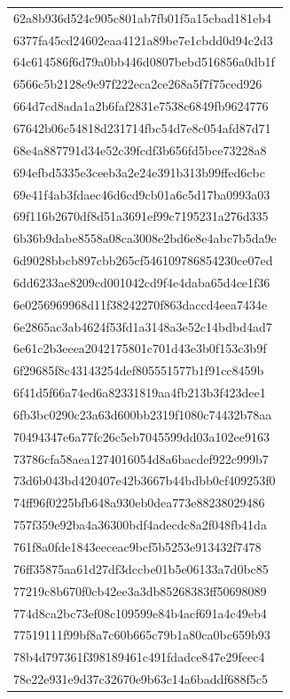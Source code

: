 \begin{tabular}{l}
62a8b936d524c905c801ab7fb01f5a15cbad181eb4 \\
6377fa45cd24602eaa4121a89be7e1cbdd0d94c2d3 \\
64c614586f6d79a0bb446d0807bebd516856a0db1f \\
6566c5b2128e9e97f222eca2ce268a5f7f75ced926 \\
664d7cd8ada1a2b6faf2831e7538c6849fb9624776 \\
67642b06c54818d231714fbc54d7e8c054afd87d71 \\
68e4a887791d34e52c39fcdf3b656fd5bce73228a8 \\
694efbd5335e3ceeb3a2e24e391b313b99ffed6cbc \\
69e41f4ab3fdaec46d6cd9cb01a6c5d17ba0993a03 \\
69f116b2670df8d51a3691ef99c7195231a276d335 \\
6b36b9dabe8558a08ca3008e2bd6e8e4abc7b5da9e \\
6d9028bbcb897cbb265cf546109786854230ce07ed \\
6dd6233ae8209cd001042cd9f4e4daba65d4ce1f36 \\
6e0256969968d11f38242270f863daccd4eea7434e \\
6e2865ac3ab4624f53fd1a3148a3e52c14bdbd4ad7 \\
6e61c2b3eeea2042175801c701d43e3b0f153c3b9f \\
6f29685f8c43143254def805551577b1f91cc8459b \\
6f41d5f66a74ed6a82331819aa4fb213b3f423dee1 \\
6fb3bc0290c23a63d600bb2319f1080c74432b78aa \\
70494347e6a77fc26c5eb7045599dd03a102ee9163 \\
73786cfa58aea1274016054d8a6bacdef922c999b7 \\
73d6b043bd420407e42b3667b44bdbb0cf409253f0 \\
74ff96f0225bfb648a930eb0dea773e88238029486 \\
757f359e92ba4a36300bdf4adecdc8a2f048fb41da \\
761f8a0fde1843eeceac9bcf5b5253e913432f7478 \\
76ff35875aa61d27df3dccbe01b5e06133a7d0bc85 \\
77219c8b670f0cb42ee3a3db85268383ff50698089 \\
774d8ca2bc73ef08c109599e84b4acf691a4c49eb4 \\
77519111f99bf8a7c60b665c79b1a80ca0bc659b93 \\
78b4d797361f398189461c491fdadce847e29feec4 \\
78e22e931e9d37c32670e9b63c14a6baddf688f5c5 \\

\end{tabular}
